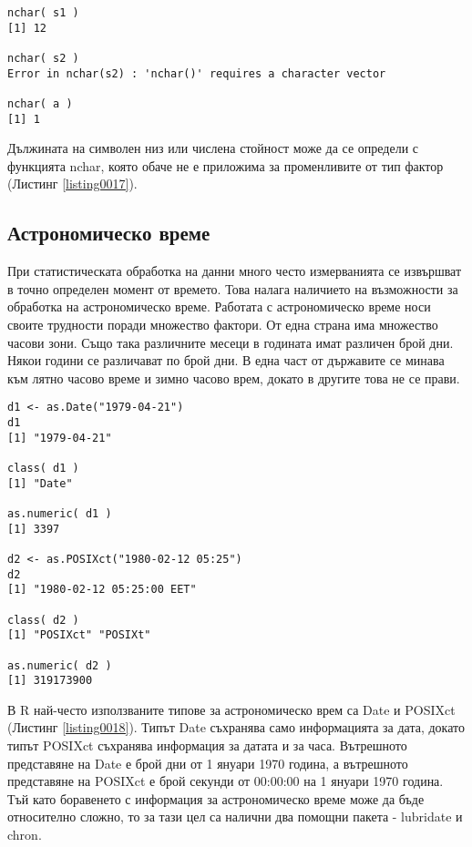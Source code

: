 \begin{lstlisting}[caption=Дължина на символен низ или числена стойност, label=listing0017]
nchar( s1 )
[1] 12

nchar( s2 )
Error in nchar(s2) : 'nchar()' requires a character vector

nchar( a )
[1] 1
\end{lstlisting}

Дължината на символен низ или числена стойност може да се определи с функцията nchar, която обаче не е приложима за променливите от тип фактор (Листинг \ref{listing0017}).

\subsection{Астрономическо време}

При статистическата обработка на данни много често измерванията се извършват в точно определен момент от времето. Това налага наличието на възможности за обработка на астрономическо време. Работата с астрономическо време носи своите трудности поради множество фактори. От една страна има множество часови зони. Също така различните месеци в годината имат различен брой дни. Някои години се различават по брой дни. В една част от държавите се минава към лятно часово време и зимно часово врем, докато в другите това не се прави. 

\begin{lstlisting}[caption=Типове данни за време, label=listing0018]
d1 <- as.Date("1979-04-21")
d1
[1] "1979-04-21"

class( d1 )
[1] "Date"

as.numeric( d1 )
[1] 3397

d2 <- as.POSIXct("1980-02-12 05:25")
d2
[1] "1980-02-12 05:25:00 EET"

class( d2 )
[1] "POSIXct" "POSIXt" 

as.numeric( d2 )
[1] 319173900
\end{lstlisting}

В R най-често използваните типове за астрономическо врем са Date и POSIXct (Листинг \ref{listing0018}). Типът Date съхранява само информацията за дата, докато типът POSIXct съхранява информация за датата и за часа. Вътрешното представяне на Date е брой дни от 1 януари 1970 година, а вътрешното представяне на POSIXct е брой секунди от 00:00:00 на 1 януари 1970 година. Тъй като боравенето с информация за астрономическо време може да бъде относително сложно, то за тази цел са налични два помощни пакета - lubridate и chron. 

